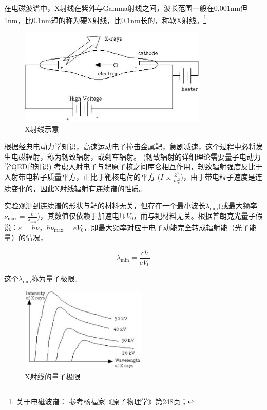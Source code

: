 在电磁波谱中，X射线在紫外与Gamma射线之间，波长范围一般在0.001nm但1nm，比0.1nm短的称为硬X射线，比0.1nm长的，称软X射线。\footnote{关于电磁波谱：
参考杨福家《原子物理学》第248页；}

\begin{figure}[h]
\begin{center}
\includegraphics[width=9cm]{Duality/3-2.ps}
\caption{X射线示意}
\end{center}
\end{figure}

根据经典电动力学知识，高速运动电子撞击金属靶，急剧减速，这个过程中必将发生电磁辐射，称为轫致辐射，或刹车辐射。
(轫致辐射的详细理论需要量子电动力学QED的知识)
考虑入射电子与耙原子核之间库仑相互作用，轫致辐射强度反比于入射带电粒子质量平方，正比于靶核电荷的平方
($I \propto \frac{{Z^2 }}{{m_e ^2 }}$)，由于带电粒子速度是连续变化的，因此X射线辐射有连续谱的性质。

实验观测到连续谱的形状与靶的材料无关，但存在一个最小波长$\lambda _{\min}$(或最大频率$\nu _{\max }  = \frac{c}{{\lambda _{\min } }}$)，其数值仅依赖于加速电压$V_0$，而与耙材料无关。根据普朗克光量子假说：$\varepsilon  = h\nu $，$h\nu _{\max }  = eV_0 $，即最大频率对应于电子动能完全转成辐射能（光子能量）的情况，

\begin{equation}
\lambda _{\min }  = \frac{{ch}}{{eV_0 }}
\end{equation}

这个$\lambda _{\min }$称为量子极限。

\begin{figure}[h]
\begin{center}
\includegraphics[width=6cm]{Duality/3-3.ps}
\caption{X射线的量子极限}
\end{center}
\end{figure}

